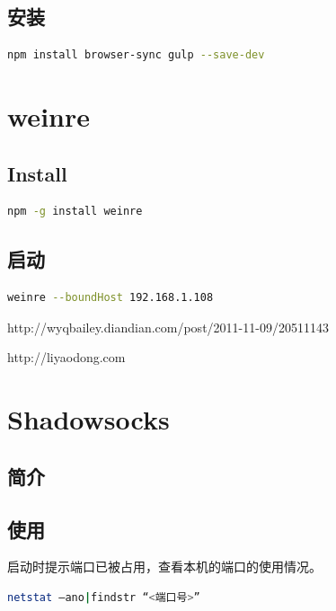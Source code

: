 \documentclass{book}
\begin{document}
\subsection{安装}

\begin{lstlisting}[language=bash]
npm install browser-sync gulp --save-dev
\end{lstlisting}

\section{weinre}

\subsection{Install}

\begin{lstlisting}[language=bash]
npm -g install weinre
\end{lstlisting}

\subsection{启动}

\begin{lstlisting}[language=bash]
weinre --boundHost 192.168.1.108
\end{lstlisting}

http://wyqbailey.diandian.com/post/2011-11-09/20511143


http://liyaodong.com

\section{Shadowsocks}

\subsection{简介}

\subsection{使用}

启动时提示端口已被占用，查看本机的端口的使用情况。

\begin{lstlisting}[language=bash]
netstat –ano|findstr “<端口号>”
\end{lstlisting}
\end{document}
